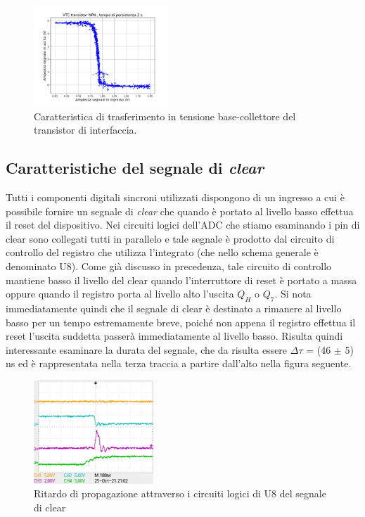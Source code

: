 \documentclass[journal]{IEEEtran}
\begin{document}
\begin{figure}[H]%
\begin{center}
\includegraphics[width=0.45\textwidth]{analysis/output/NPN-XY.pdf}
\caption{Caratteristica di trasferimento in tensione base-collettore del transistor di interfaccia.}
\label{fig:VTC-bjt}
\end{center}
\end{figure}


\subsection{Caratteristiche del segnale di \textit{clear}}
Tutti i componenti digitali sincroni utilizzati dispongono di un ingresso a cui è possibile fornire un segnale di \textit{clear} che quando è portato al livello basso effettua il reset del dispositivo. Nei circuiti logici dell'ADC che stiamo esaminando i pin di clear sono collegati tutti in parallelo e tale segnale è prodotto dal circuito di controllo del registro che utilizza l'integrato (che nello schema generale è denominato U8). Come già discusso in precedenza, tale circuito di controllo mantiene basso il livello del clear quando l'interruttore di reset è portato a massa oppure quando il registro porta al livello alto l'uscita $Q_H$ o $Q_7$. Si nota immediatamente quindi che il segnale di clear è destinato a rimanere al livello basso per un tempo estremamente breve, poiché non appena il registro effettua il reset l'uscita suddetta passerà immediatamente al livello basso. Risulta quindi interessante esaminare la durata del segnale, che da risulta essere $\Delta \tau$ = (46 $\pm$ 5) ns ed è rappresentata nella terza traccia a partire dall'alto nella figura seguente.

\begin{figure}[H]%
\begin{center}
\includegraphics[width=0.40\textwidth]{data-source/25-10-21/clear.jpg}
\caption{Ritardo di propagazione attraverso i circuiti logici di U8 del segnale di clear}
\label{fig:clear-delay}
\end{center}
\end{figure}
\end{document}
